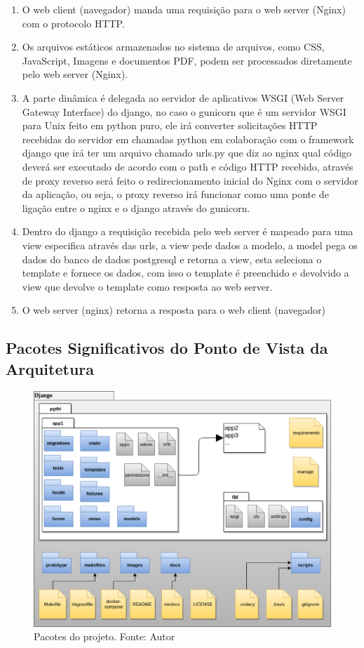 \begin{enumerate}
  \item O web client (navegador) manda uma requisição para o web server (Nginx) com o protocolo HTTP.
  \item Os arquivos estáticos armazenados no sistema de arquivos, como CSS, JavaScript, Imagens e documentos PDF,
    podem ser processados diretamente pelo web server (Nginx).
  \item A parte dinâmica é delegada ao servidor de aplicativos WSGI (Web Server Gateway Interface) do django, no caso
    o gunicorn que é um servidor WSGI para Unix feito em python puro, ele irá converter solicitações HTTP recebidas
    do servidor em chamadas python em colaboração com o framework django que irá ter um arquivo chamado urls.py que
    diz ao nginx qual código deverá ser executado de acordo com o path e código HTTP recebido, através de proxy
    reverso será feito o redirecionamento inicial do Nginx com o servidor da aplicação, ou seja, o proxy reverso
    irá funcionar como uma ponte de ligação entre o nginx e o django através do gunicorn.
  \item Dentro do django a requisição recebida pelo web server é mapeado para uma view especifica através das urls,
    a view pede dados a modelo, a model pega os dados do banco de dados postgresql e retorna a view, esta seleciona
    o template e fornece os dados, com isso o template é preenchido e devolvido a view que devolve o template como
    resposta ao web server.
  \item O web server (nginx) retorna a resposta para o web client (navegador)
\end{enumerate}

\subsection{Pacotes Significativos do Ponto de Vista da Arquitetura}

\begin{figure}[H]
	\centering
  \includegraphics[keepaspectratio=true,scale=0.5]{figuras/pacotes.eps}
  \caption[Pacotes do projeto.]{Pacotes do projeto. Fonte: Autor}
	\label{fig:pacotes}
\end{figure}

